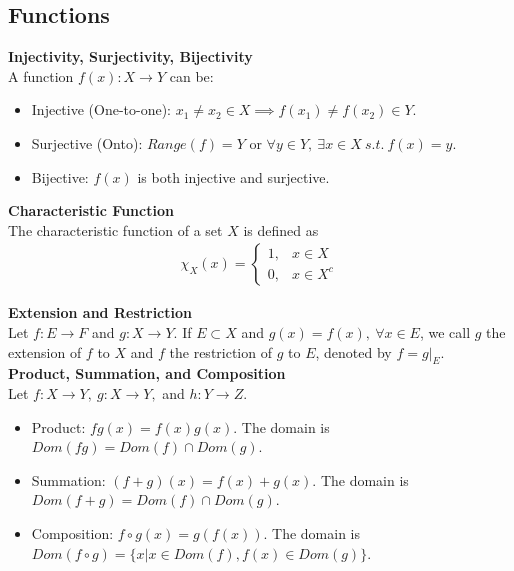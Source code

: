 \documentclass{article}
\numberwithin{theorem}{subsection}
\numberwithin{theorem}{subsubsection}
\theoremstyle{definition}
\numberwithin{definition}{subsection}
\numberwithin{definition}{subsubsection}
\begin{document}
\subsection{Functions}
\noindent \textbf{Injectivity, Surjectivity, Bijectivity} \\
\indent A function $f(x) : X \rightarrow Y$ can be:
\begin{itemize}
    \item Injective (One-to-one): $x_{1} \neq x_{2} \in X \implies f(x_{1}) \neq f(x_{2}) \in Y$.
    \item Surjective (Onto): $Range(f) = Y$ or $\forall y \in Y,\ \exists x \in X\ s.t.\ f(x) = y$.
    \item Bijective: $f(x)$ is both injective and surjective.\\
\end{itemize}

\noindent \textbf{Characteristic Function} \\
\indent The characteristic function of a set $X$ is defined as
\begin{gather*}
    \chi_{X}(x) =  \begin{cases} 
                      1, & x \in X \\
                      0, & x \in X^{c}
                   \end{cases}
\end{gather*}

\noindent \textbf{Extension and Restriction} \\
\indent Let $f : E \rightarrow F$ and $g : X \rightarrow Y$. If $E \subset X$ and $g(x) = f(x),\ \forall x \in E$, we call $g$ the extension of $f$ to $X$ and $f$ the restriction of $g$ to $E$, denoted by $f = g|_{E}$. \\

\noindent \textbf{Product, Summation, and Composition} \\
\indent Let $f : X \rightarrow Y,\ g : X \rightarrow Y,$ and $h : Y \rightarrow Z$.
\begin{itemize}
    \item Product: $fg(x) = f(x)g(x)$. The domain is $Dom(fg) = Dom(f) \cap Dom(g)$.
    \item Summation: $(f + g)(x) = f(x) + g(x)$. The domain is $Dom(f+g) = Dom(f) \cap Dom(g)$.
    \item Composition: $f \circ g(x) = g(f(x))$. The domain is $Dom(f \circ g) = \{x|x\in Dom(f), f(x) \in Dom(g)\}$.\\
\end{itemize}
\end{document}
